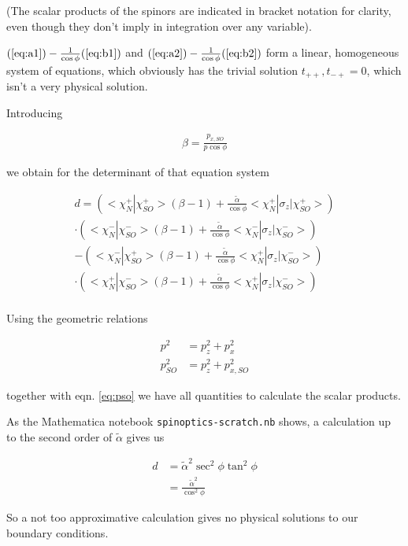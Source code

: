 \documentclass[11pt]{article}
\newcommand{\ta}{\tilde \alpha}
\begin{document}
(The scalar products of the spinors are indicated in bracket notation
for clarity, even though they don't imply in integration over any
variable).

$(\ref{eq:a1}) - \frac{1}{\cos \phi} (\ref{eq:b1})$
and
$(\ref{eq:a2}) - \frac{1}{\cos \phi} (\ref{eq:b2})$ form a linear,
homogeneous system of equations, which obviously has the trivial
solution $t_{++}, t_{-+} = 0$, which isn't a very physical solution.

Introducing

\begin{align}
    \beta = \frac{p_{x,SO}}{p \cos \phi}
\end{align}

we obtain for the determinant of that equation system

\begin{align}
    d = \left(<\chi_{N}^+|\chi_{SO}^+>( \beta - 1) +  
            \frac{\ta}{\cos \phi} <\chi_{N}^+|\sigma_z|\chi_{SO}^+>\right) \nonumber \\
        \cdot \left(<\chi_{N}^-|\chi_{SO}^->( \beta - 1) +  
            \frac{\ta}{\cos \phi} <\chi_{N}^-|\sigma_z|\chi_{SO}^->\right) \nonumber \\
     - \left(<\chi_{N}^-|\chi_{SO}^+>( \beta - 1) +  
            \frac{\ta}{\cos \phi} <\chi_{N}^+|\sigma_z|\chi_{SO}^->\right) \nonumber \\
        \cdot \left(<\chi_{N}^+|\chi_{SO}^->( \beta - 1) +  
            \frac{\ta}{\cos \phi} <\chi_{N}^+|\sigma_z|\chi_{SO}^->\right) \nonumber \\
\end{align}


Using the geometric relations

\begin{align}
    p^2         &= p_z^2 + p_x^2\\
    p_{SO}^2    &= p_z^2 + p_{x,SO}^2
\end{align}

together with eqn. \ref{eq:pso} we have all quantities to calculate
the scalar products.

As the Mathematica notebook \texttt{spinoptics-scratch.nb} shows,
a calculation up to the second order of $\ta$ gives us

\begin{align}
    d &= \ta^2 \sec^2 \phi \tan^2 \phi \nonumber\\
      &= \frac{\ta^2}{\cos^2 \phi}
\end{align}

So a not too approximative calculation gives no physical solutions to our boundary conditions.
\end{document}
